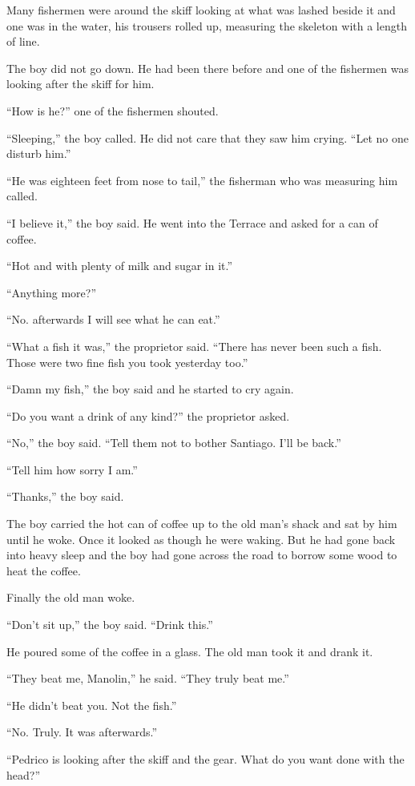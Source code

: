 \documentclass[fontset=ubuntu,zihao=-4]{ctexrep}
\begin{document}
Many fishermen were around the skiff looking at what was lashed beside it
and one was in the water, his trousers rolled up, \gls{measuring} the
\gls{skeleton} with a length of line.

The boy did not go down. He had been there before and one of the fishermen
was looking after the skiff for him.

``How is he?'' one of the fishermen shouted.

``Sleeping,'' the boy called. He did not care that they saw him crying.
``Let no one disturb him.''

``He was eighteen feet from nose to tail,'' the fisherman who was measuring him called.

``I believe it,'' the boy said. He went into the Terrace and asked for a can of coffee.

``Hot and with plenty of milk and sugar in it.''

``Anything more?''

``No. \Gls{afterwards} I will see what he can eat.''

``What a fish it was,'' the \gls{proprietor} said. ``There has never been
such a fish. Those were two fine fish you took yesterday too.''

``Damn my fish,'' the boy said and he started to cry again.

``Do you want a drink of any kind?'' the proprietor asked.

``No,'' the boy said. ``Tell them not to \gls{bother} Santiago. I'll be
back.''

``Tell him how sorry I am.''

``Thanks,'' the boy said.

The boy carried the hot can of coffee up to the old man's shack and sat by
him until he woke. Once it looked as though he were waking. But he had gone
back into heavy sleep and the boy had gone across the road to borrow some
wood to \gls{heat} the coffee.

Finally the old man woke.

``Don't sit up,'' the boy said. ``Drink this.''

He poured some of the coffee in a glass. The old man took it and drank it.

``They beat me, Manolin,'' he said. ``They truly beat me.''

``He didn't beat you. Not the fish.''

``No. Truly. It was afterwards.''

``Pedrico is looking after the skiff and the gear. What do you want done with the head?''
\end{document}
